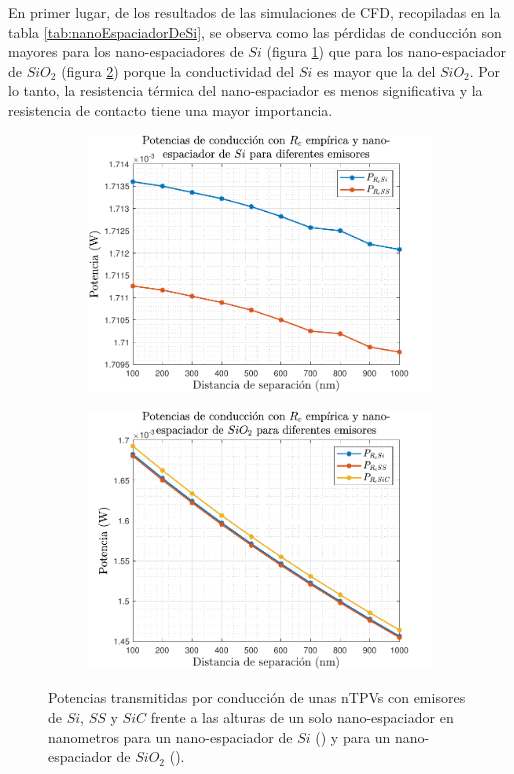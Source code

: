 En primer lugar, de los resultados de las simulaciones de CFD, recopiladas en la tabla \ref{tab:nanoEspaciadorDeSi}, se observa como las pérdidas de conducción son mayores para los nano-espaciadores de $Si$ (figura \ref{fig:prc_xxSi}) que para los nano-espaciador de $SiO_2$ (figura \ref{fig:prc_xxSiO2}) porque la conductividad del $Si$ es mayor que la del $SiO_2$. Por lo tanto, la resistencia térmica del nano-espaciador es menos significativa y la resistencia de contacto tiene una mayor importancia.
\begin{figure} [H]%
	\centering
	\begin{subfigure}[b]{0.48\textwidth}%
			\includegraphics[width=\columnwidth]{Prc_XxSiGe}%
			\caption{}%
			\label{fig:prc_xxSi}%
	\end{subfigure}
	\hfill
	\begin{subfigure}[b]{0.48\textwidth}%
			\includegraphics[width=\columnwidth]{Prc_XxSiO2Ge}%
			\caption{}%
			\label{fig:prc_xxSiO2}%
	\end{subfigure}
	\caption{Potencias transmitidas por conducción de unas nTPVs con emisores de $Si$, $SS$ y $SiC$ frente a las alturas de un solo nano-espaciador en nanometros para un nano-espaciador de $Si$ () y para un nano-espaciador de $SiO_2$ ().}%
	\label{fig:prc_xxXX}%
\end{figure}
